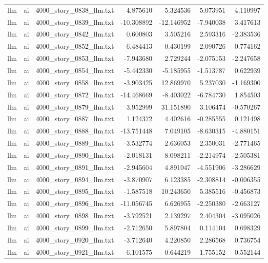 \begin{longtable}{lllrrrr}
llm & ai & 4000\_story\_0838\_llm.txt & -4.875610 & -5.324536 & 5.073951 & 4.110997 \\
llm & ai & 4000\_story\_0839\_llm.txt & -10.308892 & -12.146952 & -7.940038 & 3.417613 \\
llm & ai & 4000\_story\_0842\_llm.txt & 0.600803 & 3.505216 & 2.593316 & -2.383536 \\
llm & ai & 4000\_story\_0852\_llm.txt & -6.484413 & -0.430199 & -2.090726 & -0.774162 \\
llm & ai & 4000\_story\_0853\_llm.txt & -7.943680 & 2.729244 & -2.075153 & -2.247658 \\
llm & ai & 4000\_story\_0854\_llm.txt & -5.442330 & -5.185955 & -1.513787 & 0.622939 \\
llm & ai & 4000\_story\_0858\_llm.txt & -3.903425 & 12.869970 & 5.237030 & -1.169300 \\
llm & ai & 4000\_story\_0872\_llm.txt & -14.468669 & -8.403022 & -6.784730 & 1.854503 \\
llm & ai & 4000\_story\_0879\_llm.txt & 3.952999 & 31.151890 & 3.106474 & -0.570267 \\
llm & ai & 4000\_story\_0887\_llm.txt & 1.124372 & 4.402616 & -0.285555 & 0.121498 \\
llm & ai & 4000\_story\_0888\_llm.txt & -13.751448 & 7.049105 & -8.630315 & -4.880151 \\
llm & ai & 4000\_story\_0889\_llm.txt & -3.532774 & 2.636053 & 2.350031 & -2.771465 \\
llm & ai & 4000\_story\_0890\_llm.txt & -2.018131 & 8.098211 & -2.214974 & -2.505381 \\
llm & ai & 4000\_story\_0891\_llm.txt & -2.945604 & 4.891047 & -4.551906 & -3.286629 \\
llm & ai & 4000\_story\_0894\_llm.txt & -3.870907 & 6.123385 & -2.308814 & -0.006355 \\
llm & ai & 4000\_story\_0895\_llm.txt & -1.587518 & 10.243650 & 5.385516 & -0.456873 \\
llm & ai & 4000\_story\_0896\_llm.txt & -11.056745 & 6.626955 & -2.250380 & -2.663127 \\
llm & ai & 4000\_story\_0898\_llm.txt & -3.792521 & 2.139297 & 2.404304 & -3.095026 \\
llm & ai & 4000\_story\_0899\_llm.txt & -2.712650 & 5.897804 & 0.114104 & 0.698329 \\
llm & ai & 4000\_story\_0920\_llm.txt & -3.712640 & 4.220850 & 2.286568 & 0.736754 \\
llm & ai & 4000\_story\_0921\_llm.txt & -6.101575 & -0.644219 & -1.755152 & -0.552144 \\

\end{longtable}
